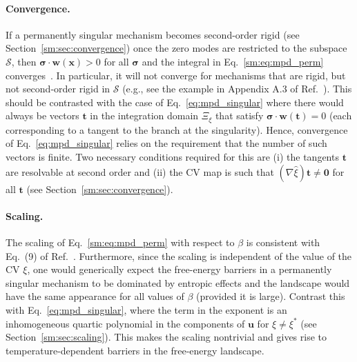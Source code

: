 \paragraph{Convergence.}
If a permanently singular mechanism becomes second-order rigid (see Section~\ref{sm:sec:convergence}) once the zero modes are restricted to the subspace $\mathscr{S}$, then $\bm{\sigma}\cdot\bm{w}(\bm{x}) > 0$ for all $\bm{\sigma}$ and the integral in Eq.~\eqref{sm:eq:mpd_perm} converges~\cite{kallus2017}.
In particular, it will not converge for mechanisms that are rigid, but not second-order rigid in $\mathscr{S}$ (e.g., see the example in Appendix A.3 of Ref.~\cite{connelly1996}).
This should be contrasted with the case of Eq.~\eqref{eq:mpd_singular} where there would always be vectors $\bm{t}$ in the integration domain $\Xi_{\xi}$ that satisfy $\bm{\sigma}\cdot\bm{w}(\bm{t}) = 0$ (each corresponding to a tangent to the branch at the singularity).
Hence, convergence of Eq.~\eqref{eq:mpd_singular} relies on the requirement that the number of such vectors is finite. Two necessary conditions required for this are (i) the tangents $\bm{t}$ are resolvable at second order and (ii) the CV map is such that $(\nabla\hat{\xi})\bm{t} \neq \bm{0}$ for all $\bm{t}$ (see Section~\ref{sm:sec:convergence}).

\paragraph{Scaling.}
The scaling of Eq.~\eqref{sm:eq:mpd_perm} with respect to $\beta$ is consistent with Eq.~(9) of Ref.~\cite{kallus2017}.
Furthermore, since the scaling is independent of the value of the CV $\xi$, one would generically expect the free-energy barriers in a permanently singular mechanism to be dominated by entropic effects and the landscape would have the same appearance for all values of $\beta$ (provided it is large).
Contrast this with Eq.~\eqref{eq:mpd_singular}, where the term in the exponent is an inhomogeneous quartic polynomial in the components of $\bm{u}$ for $\xi \neq \xi^{*}$ (see Section~\ref{sm:sec:scaling}).
This makes the scaling nontrivial and gives rise to temperature-dependent barriers in the free-energy landscape.

